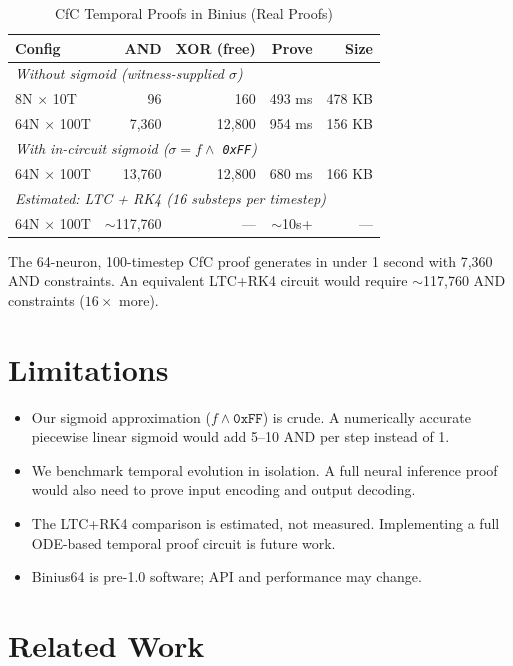 \documentclass[11pt]{article}
\begin{document}
\begin{table}[h]
\centering
\caption{CfC Temporal Proofs in Binius (Real Proofs)}
\label{tab:cfc}
\begin{tabular}{@{}lrrrr@{}}
\toprule
\textbf{Config} & \textbf{AND} & \textbf{XOR (free)} & \textbf{Prove} & \textbf{Size} \\
\midrule
\multicolumn{5}{l}{\emph{Without sigmoid (witness-supplied $\sigma$)}} \\
8N $\times$ 10T & 96 & 160 & 493 ms & 478 KB \\
64N $\times$ 100T & 7,360 & 12,800 & 954 ms & 156 KB \\
\midrule
\multicolumn{5}{l}{\emph{With in-circuit sigmoid ($\sigma = f \wedge$ \texttt{0xFF})}} \\
64N $\times$ 100T & 13,760 & 12,800 & 680 ms & 166 KB \\
\midrule
\multicolumn{5}{l}{\emph{Estimated: LTC + RK4 (16 substeps per timestep)}} \\
64N $\times$ 100T & $\sim$117,760 & --- & $\sim$10s+ & --- \\
\bottomrule
\end{tabular}
\end{table}

The 64-neuron, 100-timestep CfC proof generates in under 1 second with 7,360 AND constraints. An equivalent LTC+RK4 circuit would require $\sim$117,760 AND constraints ($16\times$ more).

\section{Limitations}

\begin{itemize}
    \item Our sigmoid approximation ($f \wedge \texttt{0xFF}$) is crude. A numerically accurate piecewise linear sigmoid would add 5--10 AND per step instead of 1.
    \item We benchmark temporal evolution in isolation. A full neural inference proof would also need to prove input encoding and output decoding.
    \item The LTC+RK4 comparison is estimated, not measured. Implementing a full ODE-based temporal proof circuit is future work.
    \item Binius64 is pre-1.0 software; API and performance may change.
\end{itemize}

\section{Related Work}
\end{document}
